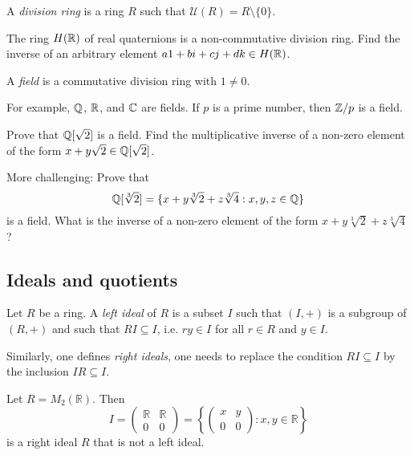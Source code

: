\begin{definition}
	A \emph{division ring} is a ring $R$ 
	such that $\mathcal{U}(R)=R\setminus\{0\}$.  	
\end{definition}

The ring $H(\mathbb{R})$ of real quaternions is a non-commutative division ring. Find the inverse of
an arbitrary element $a1+bi+cj+dk\in H(\mathbb{R})$. 

\begin{definition}
	A \emph{field} is a commutative division ring with $1\ne 0$. 
\end{definition}

For example, $\mathbb{Q}$, $\mathbb{R}$, and $\mathbb{C}$ are fields. 
If $p$ is a prime number, then $\mathbb{Z}/p$ is a field. 	

\begin{exercise}
\label{xca:Qsqrt2}
	Prove that $\mathbb{Q}[\sqrt{2}]$ is a field. 
	Find the multiplicative inverse of a non-zero element of the form 
	$x+y\sqrt{2}\in\mathbb{Q}[\sqrt{2}]$.  
\end{exercise}

More challenging: Prove that 
\[
\mathbb{Q}[\sqrt[3]{2}]=\{x+y\sqrt[3]{2}+z\sqrt[3]{4}:x,y,z\in\mathbb{Q}\}
\]
is a field. What is the inverse of a non-zero element of the form $x+y\sqrt[3]{2}+z\sqrt[3]{4}$?

\subsection{Ideals and quotients}

\begin{definition}
	Let $R$ be a ring. A \emph{left ideal} of $R$ is a subset $I$ such that 
	$(I,+)$ is a subgroup of $(R,+)$ and such that $RI\subseteq I$, 
	i.e. $ry\in I$ for all $r\in R$ and $y\in I$. 
\end{definition}

Similarly, one defines \emph{right ideals}, one needs 
to replace the condition $RI\subseteq I$ by 
the inclusion 
$IR\subseteq I$. 

\begin{example}
Let $R=M_{2}(\mathbb{R})$. Then   
\[
I=\left(\begin{array}{cc}
\mathbb{R} & \mathbb{R}\\
0 & 0
\end{array}\right)=\left\{ \left(\begin{array}{cc}
x & y\\
0 & 0
\end{array}\right):x,y\in\mathbb{R}\right\} 
\]
is a right ideal $R$ that is not a left ideal. 
\end{example}

